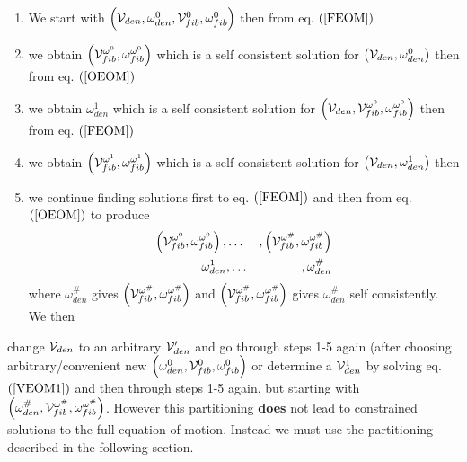 \begin{enumerate}
\item We start with $\left( {\cal V}_{den},\omega _{den}^{0},{\cal V}%
_{fib}^{0},\omega _{fib}^{0}\right) $ then from eq. $\left( \ref{FEOM}%
\right) $

\item we obtain $\left( {\cal V}_{fib}^{\omega ^{0}},\omega _{fib}^{\omega
^{0}}\right) $ which is a self consistent solution for $\left( {\cal V}%
_{den},\omega _{den}^{0}\right) $ then from eq. $\left( \ref{OEOM}\right) $

\item we obtain $\omega _{den}^{1}$ which is a self consistent solution for $%
\left( {\cal V}_{den},{\cal V}_{fib}^{\omega ^{0}},\omega _{fib}^{\omega
^{0}}\right) $ then from eq. $\left( \ref{FEOM}\right) $

\item we obtain $\left( {\cal V}_{fib}^{\omega ^{1}},\omega _{fib}^{\omega
^{1}}\right) $ which is a self consistent solution for $\left( {\cal V}%
_{den},\omega _{den}^{1}\right) $ then

\item we continue finding solutions first to eq. $\left( \ref{FEOM}\right) $
and then from eq. $\left( \ref{OEOM}\right) $ to produce 
\begin{eqnarray}
\left( {\cal V}_{fib}^{\omega ^{0}},\omega _{fib}^{\omega ^{0}}\right) ,
&\ldots &,\left( {\cal V}_{fib}^{\omega ^{\#}},\omega _{fib}^{\omega
^{\#}}\right) \\
\omega _{den}^{1} &,\ldots &,\omega _{den}^{\#}
\end{eqnarray}%
where $\omega _{den}^{\#}$ gives $\left( {\cal V}_{fib}^{\omega
^{\#}},\omega _{fib}^{\omega ^{\#}}\right) $ and $\left( {\cal V}%
_{fib}^{\omega ^{\#}},\omega _{fib}^{\omega ^{\#}}\right) $ gives $\omega
_{den}^{\#}$ self consistently. We then
\end{enumerate}

change ${\cal V}_{den}$ to an arbitrary ${\cal V}_{den}^{\prime }$ and go
through steps 1-5 again (after choosing arbitrary/convenient new $\left(
\omega _{den}^{0},{\cal V}_{fib}^{0},\omega _{fib}^{0}\right) $ or determine
a ${\cal V}_{den}^{1}$ by solving eq. $\left( \ref{VEOM1}\right) $ and then
through steps 1-5 again, but starting with $\left( \omega _{den}^{\#},{\cal V%
}_{fib}^{\omega ^{\#}},\omega _{fib}^{\omega ^{\#}}\right) $. However this
partitioning {\bf does }not lead to constrained solutions to the full
equation of motion. Instead we must use the partitioning described in the
following section.

